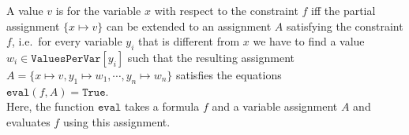 \begin{Definition}
A value $v$ is  for the variable $x$ with respect to the constraint $f$ 
iff the partial assignment $\{ x \mapsto v \}$ can be extended to an assignment $A$ satisfying the constraint $f$,
i.e.~for every variable $y_i$ that is different from $x$ we have to find a value $w_i \in
\texttt{ValuesPerVar}[y_i]$ such that the resulting assignment $A = \{ x \mapsto v, y_1 \mapsto w_1, \cdots, y_n \mapsto w_n \}$ satisfies the equations
\\[0.2cm]
\hspace*{1.3cm}
$\texttt{eval}(f, A) = \texttt{True}$.
\\[0.2cm]
Here, the function $\texttt{eval}$ takes a formula $f$ and a variable assignment $A$ and evaluates $f$ using this
assignment. \eoxs
\end{Definition}

